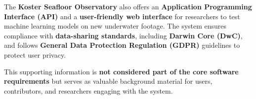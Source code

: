 The \textbf{Koster Seafloor Observatory} also offers an \textbf{Application Programming Interface (API)} and a \textbf{user-friendly web interface} for researchers to test machine learning models on new underwater footage. The system ensures compliance with \textbf{data-sharing standards}, including \textbf{Darwin Core (DwC)}, and follows \textbf{General Data Protection Regulation (GDPR)} guidelines to protect user privacy.

This supporting information is \textbf{not considered part of the core software requirements} but serves as valuable background material for users, contributors, and researchers engaging with the system.

